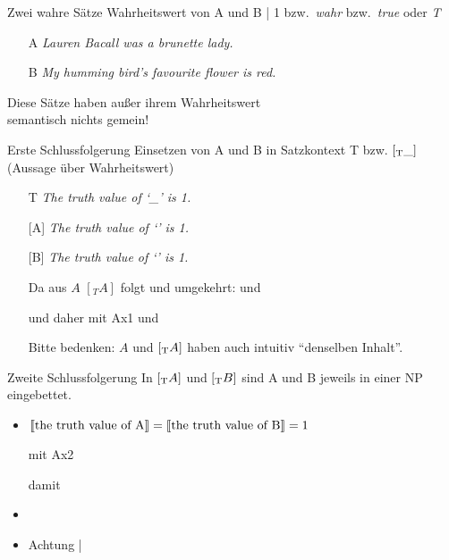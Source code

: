 \begin{frame}
  {Zwei wahre Sätze}
  \onslide<+->
  \onslide<+->
  Wahrheitswert von A und B | \alert{1} bzw.\ \alert{\textit{wahr}} bzw.\ \alert{\textit{true}} oder \alert{\textit{T}}\\
  \Zeile
  \begin{itemize}[<+->]
    \item[A] \textit{Lauren Bacall was a brunette lady.}
    \item[B] \textit{My humming bird's favourite flower is red.} 
  \end{itemize}
  \Doppelzeile
  \centering \alert{\Large Diese Sätze haben außer ihrem Wahrheitswert\\
  semantisch nichts gemein!}
\end{frame}

\begin{frame}
  {Erste Schlussfolgerung}
  \onslide<+->
  \onslide<+->
  Einsetzen von A und B in \alert{Satzkontext T bzw. $[_{\text{T}}\_]$} (Aussage über Wahrheitswert)\\
  \Halbzeile
  \begin{itemize}[<+->]
    \item[T] \alert{\textit{The truth value of `\_' is 1.}}
      \Halbzeile
    \item[{[\Sub{T}A]}] \alert{\textit{The truth value of `' is 1.}}
    \item[{[\Sub{T}B]}] \alert{\textit{The truth value of `' is 1.}}
      \Halbzeile
    \item[ ] Da aus $A$ $[_T A]$ folgt und umgekehrt:  und 
    \item[ ] und daher mit Ax1  und 
      \Halbzeile
    \item[ ] Bitte bedenken: $A$ und $[_{\text{T}}A]$ haben auch intuitiv "`denselben Inhalt"'.
  \end{itemize}
\end{frame}

\begin{frame}
  {Zweite Schlussfolgerung}
  \onslide<+->
  \onslide<+->
  In $[_{\text{T}}A]$ und $[_{\text{T}}B]$ sind A und B jeweils in einer NP eingebettet.\\
  \Halbzeile
  \begin{itemize}[<+->]
    \item $\llbracket\text{the truth value of A}\rrbracket=\llbracket\text{the truth value of B}\rrbracket=1$
    \item[ ] mit Ax2 \gruen{$\den{[\Sub{T}A]}=\den{[\Sub{T}B]}$}
    \item[ ] damit 
      \Halbzeile
    \item {}\\
    \item Achtung | 
  \end{itemize}
\end{frame}

